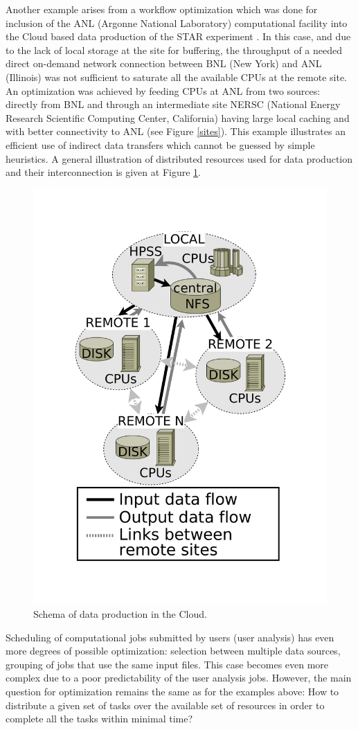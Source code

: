 \documentclass[english]{ddny}
\begin{document}
Another example arises from a workflow optimization which was done for inclusion of the ANL (Argonne National Laboratory) computational facility into the Cloud based data production of the STAR experiment \cite{Balewski}. In this case, and due to the lack of local storage at the site for buffering, the throughput of a needed direct on-demand network connection between BNL (New York) and ANL (Illinois) was not sufficient to saturate all the available CPUs at the remote site. An optimization was achieved by feeding CPUs at ANL from two sources: directly from BNL and through an intermediate site NERSC (National Energy Research Scientific Computing Center, California) having large local caching and with better connectivity to ANL (see Figure \ref{sites}). This example illustrates an efficient use of indirect data transfers which cannot be guessed by simple heuristics. A general illustration of distributed resources used for data production and their interconnection is given at Figure \ref{fig:simulated grig}.

\begin{figure}[h]
\centering
    \includegraphics[trim =30mm 30mm 30mm 30mm ,clip, width=.4\textwidth]{pic/Data_production_general_bw2.pdf}
    \caption{Schema of data production in the Cloud.}
    \label{fig:simulated grig}
\end{figure}

Scheduling of computational jobs submitted by users (user analysis) has even more degrees of possible optimization: selection between multiple data sources, grouping of jobs that use the same input files. This case becomes even more complex due to a poor predictability of the user analysis jobs. However,  the main question for optimization remains the same as for the examples above: How to distribute a given set of tasks over the available set of resources in order to complete all the tasks within minimal time?
\end{document}
